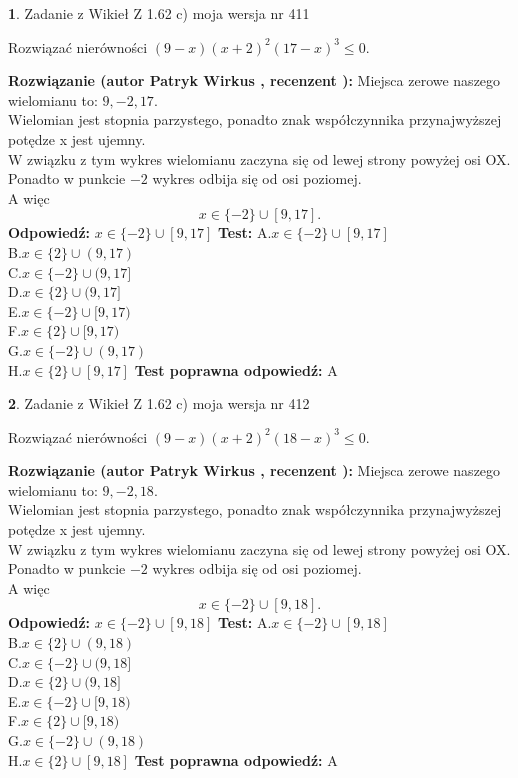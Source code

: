 \documentclass[12pt, a4paper]{article}
\theoremstyle{definition} %
\newtheorem{zad}{}
\newcommand{\zadStart}[1]{\begin{zad}#1\newline}
\newcommand{\zadStop}{\end{zad}}
\newcommand{\rozwStart}[2]{\noindent \textbf{Rozwiązanie (autor #1 , recenzent #2): }\newline}
\newcommand{\rozwStop}{\newline}
\newcommand{\odpStart}{\noindent \textbf{Odpowiedź:}\newline}
\newcommand{\odpStop}{\newline}
\newcommand{\testStart}{\noindent \textbf{Test:}\newline}
\newcommand{\testStop}{\newline}
\newcommand{\kluczStart}{\noindent \textbf{Test poprawna odpowiedź:}\newline}
\newcommand{\kluczStop}{\newline}
\begin{document}
\zadStart{Zadanie z Wikieł Z 1.62 c) moja wersja nr 411}

Rozwiązać nierówności $(9-x)(x+2)^{2}(17-x)^{3}\le0$.
\zadStop
\rozwStart{Patryk Wirkus}{}
Miejsca zerowe naszego wielomianu to: $9, -2, 17$.\\
Wielomian jest stopnia parzystego, ponadto znak współczynnika przy\linebreak najwyższej potędze x jest ujemny.\\ W związku z tym wykres wielomianu zaczyna się od lewej strony powyżej osi OX.\\
Ponadto w punkcie $-2$ wykres odbija się od osi poziomej.\\
A więc $$x \in \{-2\} \cup [9,17].$$
\rozwStop
\odpStart
$x \in \{-2\} \cup [9,17]$
\odpStop
\testStart
A.$x \in \{-2\} \cup [9,17]$\\
B.$x \in \{2\} \cup (9,17)$\\
C.$x \in \{-2\} \cup (9,17]$\\
D.$x \in \{2\} \cup (9,17]$\\
E.$x \in \{-2\} \cup [9,17)$\\
F.$x \in \{2\} \cup [9,17)$\\
G.$x \in \{-2\} \cup (9,17)$\\
H.$x \in \{2\} \cup [9,17]$
\testStop
\kluczStart
A
\kluczStop



\zadStart{Zadanie z Wikieł Z 1.62 c) moja wersja nr 412}

Rozwiązać nierówności $(9-x)(x+2)^{2}(18-x)^{3}\le0$.
\zadStop
\rozwStart{Patryk Wirkus}{}
Miejsca zerowe naszego wielomianu to: $9, -2, 18$.\\
Wielomian jest stopnia parzystego, ponadto znak współczynnika przy\linebreak najwyższej potędze x jest ujemny.\\ W związku z tym wykres wielomianu zaczyna się od lewej strony powyżej osi OX.\\
Ponadto w punkcie $-2$ wykres odbija się od osi poziomej.\\
A więc $$x \in \{-2\} \cup [9,18].$$
\rozwStop
\odpStart
$x \in \{-2\} \cup [9,18]$
\odpStop
\testStart
A.$x \in \{-2\} \cup [9,18]$\\
B.$x \in \{2\} \cup (9,18)$\\
C.$x \in \{-2\} \cup (9,18]$\\
D.$x \in \{2\} \cup (9,18]$\\
E.$x \in \{-2\} \cup [9,18)$\\
F.$x \in \{2\} \cup [9,18)$\\
G.$x \in \{-2\} \cup (9,18)$\\
H.$x \in \{2\} \cup [9,18]$
\testStop
\kluczStart
A
\kluczStop
\end{document}
